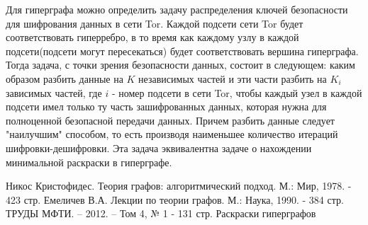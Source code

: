 \documentclass[a4paper, 12pt]{article}
\begin{document}
Для гиперграфа можно определить задачу распределения ключей безопасности для шифрования данных в сети Tor.
Каждой подсети сети Tor будет соответствовать гиперребро, в то время как каждому узлу в каждой подсети(подсети могут пересекаться)
будет соответствовать вершина гиперграфа. Тогда задача, с точки зрения безопасности данных, состоит в следующем:
каким образом разбить данные на $K$ независимых частей и эти части разбить на $K_i$ зависимых частей, где $i$ - номер подсети в сети Tor,
чтобы каждый узел в каждой подсети имел только ту часть зашифрованных данных, которая нужна для полноценной безопасной передачи данных.
Причем разбить данные следует "наилучшим" способом, то есть производя наименьшее количество итераций шифровки-дешифровки.
Эта задача эквивалентна задаче о нахождении минимальной раскраски в гиперграфе.

\newpage
\begin{thebibliography}{3}
    Никос Кристофидес. Теория графов: алгоритмический подход. М.: Мир, 1978. - 423 стр.
    Емеличев В.А. Лекции по теории графов. М.: Наука, 1990. - 384 стр.
    ТРУДЫ МФТИ. -- 2012. -- Том 4, № 1 - 131 стр. Раскраски гиперграфов
\end{thebibliography}

\newpage
\tableofcontents
\end{document}
